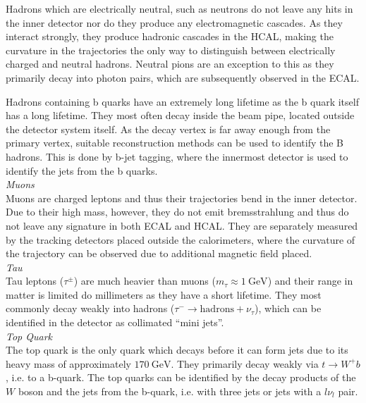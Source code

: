 \documentclass[a4paper]{report}
\numberwithin{equation}{section}
\begin{document}
Hadrons which are electrically neutral, such as neutrons do not leave any hits in the inner detector nor do they produce 
any electromagnetic cascades. As they interact strongly, they produce hadronic cascades in the HCAL, making the curvature in the trajectories
the only way to distinguish between electrically charged and neutral hadrons. Neutral pions are an exception to this as they primarily decay 
into photon pairs, which are subsequently observed in the ECAL. \par 

Hadrons containing b quarks have an extremely long lifetime as the b quark itself has a long lifetime. They most often decay inside the beam pipe, located 
outside the detector system itself. As the decay vertex is far away enough from the primary vertex, suitable reconstruction methods can be used to identify the 
B hadrons. This is done by b-jet tagging, where the innermost detector is used to identify the jets from the b quarks. \\

\noindent \textit{Muons} \\

Muons are charged leptons and thus their trajectories bend in the inner detector. Due to their high mass, however, they do not emit bremsstrahlung and thus 
do not leave any signature in both ECAL and HCAL. They are separately measured by the tracking detectors placed outside the calorimeters, where the curvature 
of the trajectory can be observed due to additional magnetic field placed. \\

\noindent \textit{Tau} \\

Tau leptons ($\tau^\pm$) are much heavier than muons ($m_\tau \approx \SI{1}{\giga\electronvolt}$) and their range in matter is limited do millimeters 
as they have a short lifetime. They most commonly decay weakly into hadrons ($\tau^- \rightarrow \mathrm{hadrons} + \nu_\tau$), which can be identified in the detector as collimated ``mini jets''. \\

\noindent \textit{Top Quark} \\

The top quark is the only quark which decays before it can form jets due to its heavy mass of approximately $\SI{170}{\giga\electronvolt}$. They 
primarily decay weakly via $t \rightarrow W^+ b$, i.e. to a b-quark. The top quarks can be identified by the decay products of the $W$ boson and the 
jets from the b-quark, i.e. with three jets or jets with a $l\nu_l$ pair. \\
\end{document}

